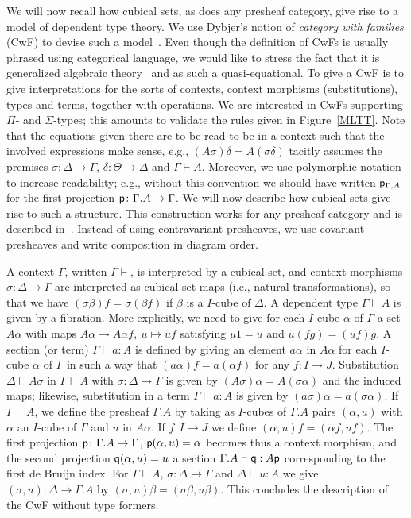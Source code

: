 \documentclass[10pt,a4paper]{article}
\newcommand{\pp}{{\sf p}}
\newcommand{\qq}{{\sf q}}
\begin{document}
We will now recall how cubical sets, as does any presheaf category,
give rise to a model of dependent type theory.  We use Dybjer's notion
of \emph{category with families} (CwF) to devise such a
model~\cite{Dybjer}.  Even though the definition of CwFs is usually
phrased using categorical language, we would like to stress the fact
that it is generalized algebraic theory~\cite{Cartmell} and as such a
quasi-equational.  To give a CwF is to give interpretations for the
sorts of contexts, context morphisms (substitutions), types and terms,
together with operations.  We are interested in CwFs supporting $\Pi$-
and $\Sigma$-types; this amounts to validate the rules given in
Figure~\ref{MLTT}.  Note that the equations given there are to be read
to be in a context such that the involved expressions make sense,
e.g., $(A \sigma) \delta = A (\sigma \delta)$ tacitly assumes the
premises $\sigma \colon \Delta \to \Gamma$, $\delta \colon \Theta \to
\Delta$ and $\Gamma \vdash A$.  Moreover, we use polymorphic notation
to increase readability; e.g., without this convention we should have
written $\pp_{\Gamma, A}$ for the first projection $\pp \colon
\Gamma.A \to \Gamma$.  We will now describe how cubical sets give rise
to such a structure.  This construction works for any presheaf
category and is described in~\cite[Sec.~4]{Hofmann}.  Instead of using
contravariant presheaves, we use covariant presheaves and write
composition in diagram order.

A context $\Gamma$, written $\Gamma \vdash$, is interpreted by a
cubical set, and context morphisms $\sigma:\Delta\to\Gamma$ are
interpreted as cubical set maps (i.e., natural transformations), so
that we have $(\sigma\beta)f = \sigma(\beta f)$ if $\beta$ is a
$I$-cube of $\Delta$.  A dependent type $\Gamma\vdash A$ is given by a
fibration.  More explicitly, we need to give for each $I$-cube
$\alpha$ of $\Gamma$ a set $A\alpha$ with maps $A\alpha\to A\alpha
f,~u\longmapsto uf$ satisfying $u1 = u$ and $u(fg) = (uf)g$.  A
section (or term) $\Gamma\vdash a:A$ is defined by giving an element
$a\alpha$ in $A\alpha$ for each $I$-cube $\alpha$ of $\Gamma$ in such
a way that $(a\alpha) f = a (\alpha f)$ for any $f \colon I \to J$.
Substitution $\Delta \vdash A \sigma$ in $\Gamma \vdash A$ with
$\sigma \colon \Delta \to \Gamma$ is given by $(A \sigma) \alpha = A
(\sigma \alpha)$ and the induced maps; likewise, substitution in a
term $\Gamma \vdash a : A$ is given by $(a \sigma) \alpha = a (\sigma
\alpha)$.  If $\Gamma\vdash A$, we define the presheaf $\Gamma.A$ by
taking as $I$-cubes of $\Gamma.A$ pairs $(\alpha,u)$ with $\alpha$ an
$I$-cube of $\Gamma$ and $u$ in $A\alpha$. If $f:I\to J$ we define
$(\alpha,u)f = (\alpha f,u f)$.  The first projection $\pp \colon
\Gamma.A \to \Gamma$, $\pp (\alpha, u) = \alpha$ becomes thus a
context morphism, and the second projection $\qq (\alpha, u) = u$ a
section $\Gamma.A \vdash \qq : A \pp$ corresponding to the first de
Bruijn index.  For $\Gamma \vdash A$, $\sigma \colon \Delta \to
\Gamma$ and $\Delta \vdash u : A$ we give $(\sigma, u) \colon \Delta
\to \Gamma.A$ by $(\sigma, u) \beta = (\sigma \beta, u \beta)$.  This
concludes the description of the CwF without type formers.
\end{document}
